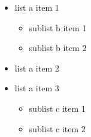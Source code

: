 \begin{itemize}

	\itemsep0em
	
	\item list a item 1
	\begin{itemize}
		
		\item sublist b item 1
		
		\item sublist b item 2
		
	\end{itemize}
	
	\item list a item 2
	
	\item list a item 3
	\begin{itemize}
		
		\item sublist c item 1
		
		\item sublist c item 2
		
	\end{itemize}
	
\end{itemize}
